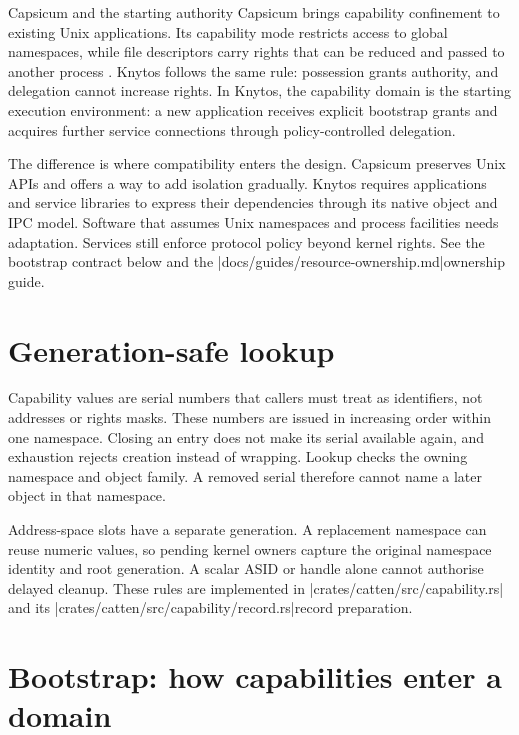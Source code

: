 \begin{architecturalcomparison}{Capsicum and the starting authority}
Capsicum brings capability confinement to existing Unix applications. Its
capability mode restricts access to global namespaces, while file descriptors
carry rights that can be reduced and passed to another process
\cite{prior:capsicum}. Knytos follows the same rule: possession grants
authority, and delegation cannot increase rights. In Knytos, the capability
domain is the starting execution environment: a new
application receives explicit bootstrap grants and acquires further service
connections through policy-controlled delegation.

The difference is where compatibility enters the design. Capsicum preserves
Unix APIs and offers a way to add isolation gradually. Knytos
requires applications and service libraries to express their dependencies
through its native object and IPC model. Software that assumes Unix namespaces
and process facilities needs adaptation. Services still enforce protocol
policy beyond kernel rights. See the bootstrap contract below and the
\repofiletext|docs/guides/resource-ownership.md|{ownership guide}.
\end{architecturalcomparison}

\section{Generation-safe lookup}

Capability values are serial numbers that callers must treat as identifiers,
not addresses or rights masks. These numbers are issued in increasing order
within one namespace.
Closing an entry does not make its serial available again, and exhaustion rejects
creation instead of wrapping. Lookup checks the owning namespace and object
family. A removed serial therefore cannot name a later object in that namespace.

Address-space slots have a separate generation. A replacement namespace can reuse
numeric values, so pending kernel owners capture the original namespace identity
and root generation. A scalar ASID or handle alone cannot authorise delayed
cleanup. These rules are implemented in \repofile|crates/catten/src/capability.rs|
and its \repofiletext|crates/catten/src/capability/record.rs|{record preparation}.

\section{Bootstrap: how capabilities enter a domain}


